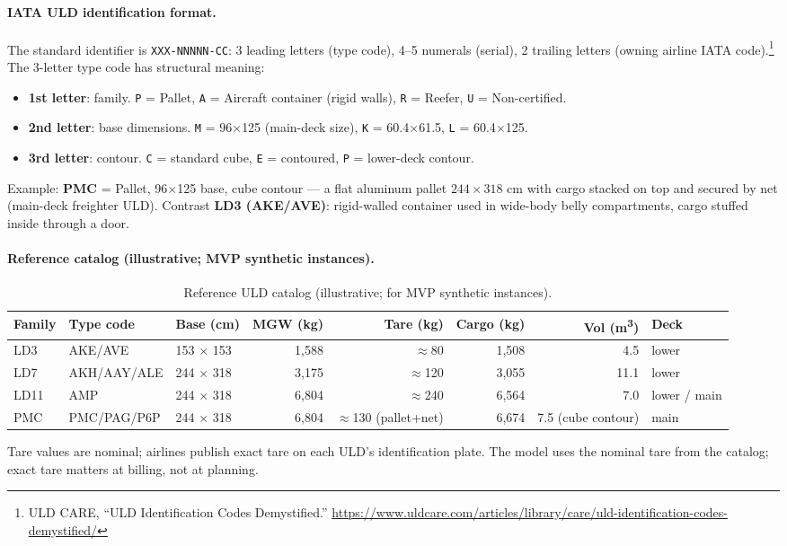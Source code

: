 \documentclass[11pt,a4paper]{article}
\theoremstyle{definition}
\begin{document}
\paragraph{IATA ULD identification format.}
The standard identifier is \texttt{XXX-NNNNN-CC}: 3 leading letters (type
code), 4--5 numerals (serial), 2 trailing letters (owning airline IATA
code).\footnote{ULD CARE, ``ULD Identification Codes Demystified.''
\url{https://www.uldcare.com/articles/library/care/uld-identification-codes-demystified/}}
The 3-letter type code has structural meaning:
\begin{itemize}[noitemsep]
  \item \textbf{1st letter}: family. \texttt{P} = Pallet, \texttt{A} = Aircraft
        container (rigid walls), \texttt{R} = Reefer, \texttt{U} = Non-certified.
  \item \textbf{2nd letter}: base dimensions. \texttt{M} =
        96\textquotedbl{}$\times$125\textquotedbl{} (main-deck size), \texttt{K} =
        60.4\textquotedbl{}$\times$61.5\textquotedbl{}, \texttt{L} =
        60.4\textquotedbl{}$\times$125\textquotedbl{}.
  \item \textbf{3rd letter}: contour. \texttt{C} = standard cube, \texttt{E} =
        contoured, \texttt{P} = lower-deck contour.
\end{itemize}
Example: \textbf{PMC} = Pallet, 96\textquotedbl{}$\times$125\textquotedbl{} base,
cube contour --- a flat aluminum pallet $244 \times 318$ cm with cargo stacked
on top and secured by net (main-deck freighter ULD). Contrast \textbf{LD3
(AKE/AVE)}: rigid-walled container used in wide-body belly compartments, cargo
stuffed inside through a door.

\paragraph{Reference catalog (illustrative; MVP synthetic instances).}
\begin{table}[H]
\centering
\small
\caption{Reference ULD catalog (illustrative; for MVP synthetic instances).}
\label{tab:uld-reference}
\begin{tabular}{lllrrrrl}
\toprule
Family & Type code & Base (cm) & MGW (kg) & Tare (kg) & Cargo (kg) & Vol (m\textsuperscript{3}) & Deck \\
\midrule
LD3 & AKE/AVE & 153 $\times$ 153 & 1{,}588 & $\approx$80 & 1{,}508 & 4.5 & lower \\
LD7 & AKH/AAY/ALE & 244 $\times$ 318 & 3{,}175 & $\approx$120 & 3{,}055 & 11.1 & lower \\
LD11 & AMP & 244 $\times$ 318 & 6{,}804 & $\approx$240 & 6{,}564 & 7.0 & lower / main \\
PMC & PMC/PAG/P6P & 244 $\times$ 318 & 6{,}804 & $\approx$130 (pallet+net) & 6{,}674 & 7.5 (cube contour) & main \\
\bottomrule
\end{tabular}
\end{table}
Tare values are nominal; airlines publish exact tare on each ULD's
identification plate. The model uses the nominal tare from the catalog; exact
tare matters at billing, not at planning.
\end{document}
